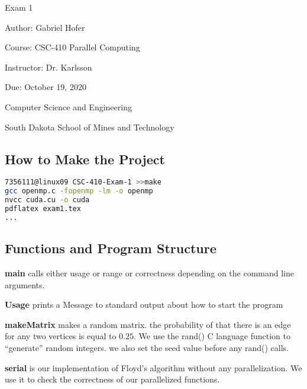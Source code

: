 \documentclass[12pt]{article}
\begin{document}
\begin{titlepage}
   \begin{center}
       \vspace*{1cm}
       \Large
       Exam 1
       \normalsize

       \vspace{0.5cm}

       Author: Gabriel Hofer

       \vspace{0.5cm}

       Course: CSC-410 Parallel Computing

       \vspace{0.5cm}

       Instructor: Dr. Karlsson
       \vspace{0.5cm}

       Due: October 19, 2020

       \vfill

       Computer Science and Engineering\

       South Dakota School of Mines and Technology\
   \end{center}
\end{titlepage}
\newpage
\subsection*{How to Make the Project}
\begin{lstlisting}[frame=single,language=Bash,caption=make \label{code:make}]
7356111@linux09 CSC-410-Exam-1 >>make
gcc openmp.c -fopenmp -lm -o openmp
nvcc cuda.cu -o cuda
pdflatex exam1.tex
...
\end{lstlisting}
\subsection*{Functions and Program Structure}
\textbf{main} calls either usage or range or correctness depending on the 
command line arguments. 

\textbf{Usage} prints a Message to standard output about how to start the program

\textbf{makeMatrix} makes a random matrix. the probability of that there is an edge 
for any two vertices is equal to $0.25$. We use the rand() C language
function to ``generate'' random integers. we also set the seed value 
before any rand() calls.

\textbf{serial} is our implementation of Floyd's algorithm without any parallelization.
We use it to check the correctness of our parallelized functions.
\end{document}
